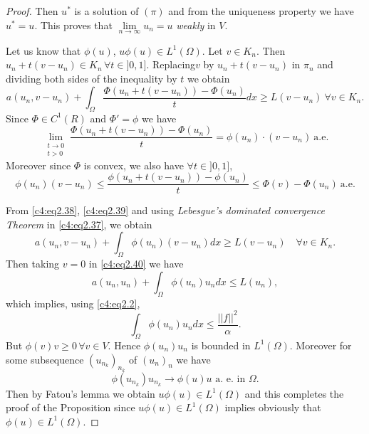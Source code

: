 \begin{proof}
Then $u^*$ is a solution of $(\pi)$ and from the uniqueness property
we have $u^* = u$. This proves that $\lim\limits_{n \to \infty} u_n =
u$ \textit{weakly} in $V$.   
 
Let us know that $\phi (u)$, $u \phi (u) \in L^1 (\Omega)$. Let $v \in
K_n$. Then $u_n + t (v-u_n) \in K_n\, \forall t \in] 0,
  1]$. Replacing\pageoriginale  $v$ by $u_n + t (v-u_n)$ in $\pi_n$
    and dividing both sides of the inequality by $t$ we obtain  
 \begin{equation}
a (u_n, v-u_n) + \int_\Omega \frac{\Phi (u_n + t (v - u_n)) -\Phi (u_n)} {t} dx \geq L (v-u_n) \ \forall v \in K_n. \tag{2.37}\label{c4:eq2.37}
 \end{equation} 
Since  $\Phi \in C^1 (R)$ and $\Phi' = \phi$ we have
 \begin{equation}
\lim_{\substack{t \to 0\\{t >0}}} \frac{\Phi (u_n + t (v-u_n)) - \Phi
  (u_n)} {t} = \phi (u_n) \cdot (v-u_n)
~\text{a.e.}\tag{2.38}\label{c4:eq2.38}  
 \end{equation} 
 Moreover since $\Phi$ is convex, we also have $\forall t \in ] 0, 1]$,
 \begin{equation}
\phi (u_n) (v-u_n) \leq \frac{\phi (u_n + t (v - u_n)) -\phi (u_n)} {t} 
\leq \Phi (v) -\Phi (u_n) ~\text{a.e.} \tag{2.39}\label{c4:eq2.39} 
 \end{equation} 
 
 From \eqref{c4:eq2.38}, \eqref{c4:eq2.39} and using
 \textit{Lebesgue's dominated convergence Theorem} in
 \eqref{c4:eq2.37}, we obtain 
 \begin{equation}
a (u_n, v-u_n)+ \int_\Omega \phi (u_n) (v-u_n) dx \geq L (v-u_n) \quad
\forall v \in K_n.\tag{2.40}\label{c4:eq2.40} 
 \end{equation} 
Then taking  $v= 0$ in \eqref{c4:eq2.40} we have
 $$
 a (u_n, u_n) + \int_\Omega \phi (u_n) u_n dx \leq L (u_n),
 $$
 which implies, using \eqref{c4:eq2.2},
 \begin{equation}
\int_\Omega \phi (u_n) u_n dx \leq \frac{||f||^2}
    {\alpha}.\tag{2.41}\label{c4:eq2.41} 
 \end{equation} 
But $\phi (v) v \geq 0\, \forall v \in V$. Hence $\phi (u_n) u_n$ is bounded in $L^1 (\Omega)$. Moreover for some subsequence $(u_{n_k})_{n_k}$ of $(u_n)_n$ we have
 $$
 \phi (u_{n_k}) u_{n_k} \to \phi (u)u \text{ a. e. in } \Omega. 
 $$
Then by Fatou's lemma we obtain $u \phi (u) \in L^1 (\Omega)$ and this completes the proof of the Proposition since $u \phi (u) \in L^1 (\Omega)$ implies obviously that $\phi (u) \in L^1 (\Omega)$.
 \end{proof}

